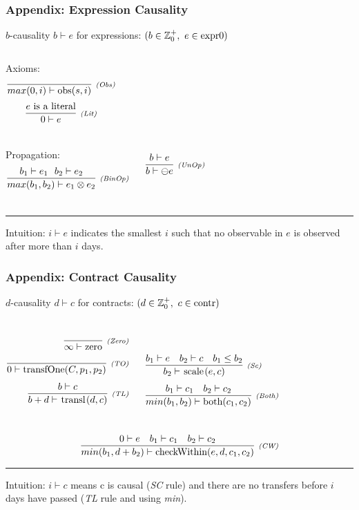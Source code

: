 \documentclass[xcolor=dvipsnames,11pt]{beamer}
\newcommand{\comment}[2]{{\tiny \color{Orange}{$\spadesuit${\bf #1: }{\sf #2}$\spadesuit$}}}
\newcommand{\jbcomment}[1]{\comment{JB}{#1}}
\renewcommand{\emph}[1]{\textcolor{structure!90}{#1}}
\newcommand{\ttt}[1]{\mbox{\cd{#1}}}
\newcommand{\zero}{\ttt{zero}}
\newcommand{\transfOne}{\ttt{transfOne}}
\newcommand{\scale}{\ttt{scale}}
\newcommand{\transl}{\ttt{transl}}
\newcommand{\both}{\ttt{both}}
\newcommand{\checkWithin}{\ttt{checkWithin}}
\begin{document}
\begin{frame}
    \frametitle{Appendix: Expression Causality}

\emph{$b$-causality} $ b \vdash e$ for \emph{expressions}:
{\scriptsize $ (b \in \mathbb{Z}_0^+, \ e \in \ttt{expr0})$}

\begin{columns}
\emph{Axioms:}
$$\crule{(Obs)}{}{max(0,i) \vdash \ttt{obs}(s,i)}$$
$$\crule{(Lit)}{e \mbox{ is a literal}}{0 \vdash e}$$
\end{columns}


\begin{columns}
\emph{Propagation:}
$$\crule{(BinOp)}{b_1 \vdash e_1\ \ b_2 \vdash e_2 }{max(b_1,b_2) \vdash e_1 \otimes e_2}$$

$$\crule{(UnOp)}{b \vdash e}{b \vdash \ominus e}$$
\end{columns}

\medskip
\hrule
\medskip

\emph{Intuition:} $i \vdash e$ indicates the smallest $i$ such that no observable in $e$ is observed \emph{after more than $i$ days}.

\end{frame}

\begin{frame}[t]
    \frametitle{Appendix: Contract Causality}

\emph{$d$-causality} $ d \vdash c$ for contracts:
{\scriptsize $ (d \in \mathbb{Z}_0^+, \ c \in \ttt{contr})$}

\begin{columns}
\begin{align*}
\crule{(Zero)}{}{\infty \vdash \zero}&\\[1ex]
\crule{(TO)}{}{0 \vdash \transfOne(C,p_1,p_2)}&\\[1ex]
\crule{(TL)}{b \vdash c}{b + d \vdash \transl(d,c)}&\\[1ex]
\end{align*}

\begin{align*}
&\\[1ex]
&\crule{(Sc)}{b_1 \vdash e\ \ \ b_2\vdash c\ \ \ b_1 \leq b_2 }{b_2 \vdash \scale(e,c)}\\[1ex]
&\crule{(Both)}{b_1 \vdash c_1\ \ \ b_2 \vdash c_2}{min(b_1,b_2) \vdash \both(c_1,c_2)}%
\end{align*}
\end{columns}
$$ 
\crule{(CW)}{0\vdash e\ \ \ b_1 \vdash c_1\ \ \ b_2 \vdash c_2}{min(b_1,d+b_2) \vdash \checkWithin(e,d,c_1,c_2)}
$$

\medskip
\hrule
\medskip

\emph{Intuition:} $i \vdash c$ means c is causal (\textit{SC} rule) and there are no transfers before $i$ days have passed (\textit{TL} rule and using \textit{min}).

\end{frame}
\end{document}
